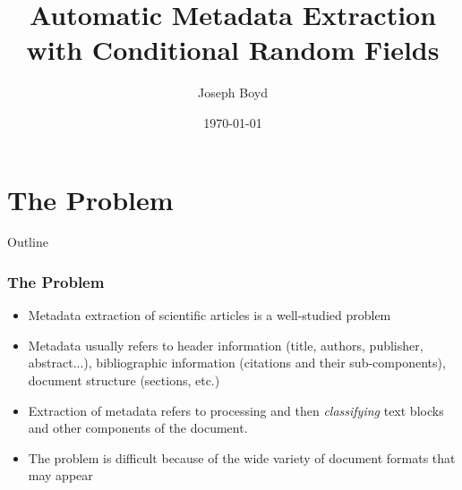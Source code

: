 \documentclass{beamer}
\title[Automatic Metadata Extraction]{Automatic Metadata Extraction with Conditional Random Fields} %
\author{Joseph Boyd} %
\institute[EPFL] %
{
\'Ecole Polytechnique F\'ed\'erale de Lausanne \\ %
\medskip
\textit{joseph.boyd@epfl.ch} %
}
\date{\today} %
\begin{document}
\begin{frame}
\titlepage %
\end{frame}


\section{The Problem}
\begin{frame}[noframenumbering]{Outline}
\end{frame}


\begin{frame}
\frametitle{The Problem}
\begin{itemize}
\item Metadata extraction of scientific articles is a well-studied problem
\item Metadata usually refers to header information (title, authors, publisher, abstract...), bibliographic information (citations and their sub-components), document structure (sections, etc.)
\item Extraction of metadata refers to processing and then \emph{classifying} text blocks and other components of the document.
\item The problem is difficult because of the wide variety of document formats that may appear
\end{itemize}
\end{frame}
\end{document}
